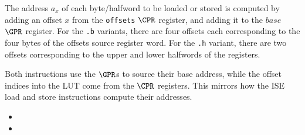 The address $a_x$ of each byte/halfword to be loaded or stored is computed by
adding an offset $x$ from the {\tt offsets} $\CPR$ register, and adding it
to the $base$ $\GPR$ register. For the {\tt .b} variants, there are four
offsets each corresponding to the four bytes of the offsets source register
word. For the {\tt .h} variant, there are two offsets corresponding to the
upper and lower halfwords of the registers.

Both instructions use the $\GPR$s to source their base address, while the
offset indices into the LUT come from the $\CPR$ registers. This mirrors
how the ISE load and store instructions compute their addresses.

\bigskip

\begin{minipage}{0.5\textwidth}
\begin{itemize}
\item {}
\item {}
\end{itemize}
\end{minipage}
